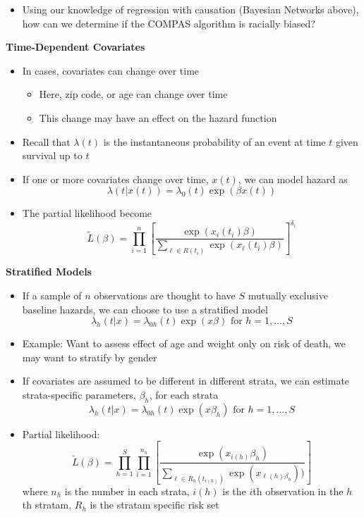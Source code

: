 \documentclass[
]{article}
\providecommand{\tightlist}{%
  \setlength{\itemsep}{0pt}\setlength{\parskip}{0pt}}
\begin{document}
\begin{itemize}
\tightlist
\item
  Using our knowledge of regression with causation (Bayesian Networks
  above), how can we determine if the COMPAS algorithm is racially
  biased?
\end{itemize}

\textbf{Time-Dependent Covariates}

\begin{itemize}
\tightlist
\item
  In cases, covariates can change over time

  \begin{itemize}
  \tightlist
  \item
    Here, zip code, or age can change over time
  \item
    This change may have an effect on the hazard function
  \end{itemize}
\item
  Recall that \(\lambda(t)\) is the instantaneous probability of an
  event at time \(t\) given survival up to \(t\)
\item
  If one or more covariates change over time, \(x(t)\), we can model
  hazard as \[\lambda(t|x(t)) = \lambda_0(t)\exp(\beta x(t))\]
\item
  The partial likelihood become
  \[\tilde L(\beta) = \prod_{i=1}^n \left[\frac{\exp(x_i(t_i)\beta)}{\sum_{\ell\in R(t_i)} \exp(x_\ell(t_i)\beta)}\right]^{\delta_i}\]
\end{itemize}

\textbf{Stratified Models}

\begin{itemize}
\tightlist
\item
  If a sample of \(n\) observations are thought to have \(S\) mutually
  exclusive baseline hazards, we can choose to use a stratified model
  \[\lambda_h(t|x) = \lambda_{0h}(t)\exp(x\beta) \text{ for } h=1,\dots,S\]
\item
  Example: Want to assess effect of age and weight only on risk of
  death, we may want to stratify by gender
\item
  If covariates are assumed to be different in different strata, we can
  estimate strata-specific parameters, \(\beta_h\), for each strata
  \[\lambda_h(t|x) = \lambda_{0h}(t)\exp(x\beta_h) \text{ for } h=1,\dots,S\]
\item
  Partial likelihood:
  \[\tilde L(\beta) = \prod_{h=1}^S \prod_{i=1}^{n_h} \left[\frac{\exp(x_{i(h)}\beta_h)}{\sum_{\ell\in R_h(t_{i(h)})} \exp(x_{\ell(h)\beta_h}))}\right]\]
  where \(n_h\) is the number in each strata, \(i(h)\) is the \(i\)th
  observation in the \(h\)th stratam, \(R_h\) is the stratam specific
  risk set
\end{itemize}
\end{document}
